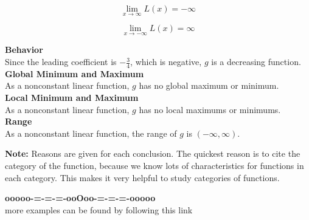 \documentclass{ximera}
\begin{document}
\begin{example}
\[
\lim\limits_{x \to \infty} L(x) = -\infty
\]

\[
\lim\limits_{x \to -\infty} L(x) = \infty
\]





\textbf{Behavior} \\

Since the leading coefficient is $-\frac{3}{4}$, which is negative, $g$ is a decreasing function. \\



\textbf{Global Minimum and Maximum} \\

As a nonconstant linear function, $g$ has no global maximum or minimum. \\



\textbf{Local Minimum and Maximum} \\

As a nonconstant linear function, $g$ has no local maximums or minimums. \\



\textbf{Range} \\

As a nonconstant linear function, the range of $g$ is $(-\infty, \infty)$. \\



\end{example}

\textbf{Note:} Reasons are given for each conclusion.  The quickest reason is to cite the category of the function, because we know lots of characteristics for functions in each category.  This makes it very helpful to study categories of functions. \\






\begin{center}
\textbf{\textcolor{green!50!black}{ooooo-=-=-=-ooOoo-=-=-=-ooooo}} \\

more examples can be found by following this link\\ 

\end{center}
\end{document}
